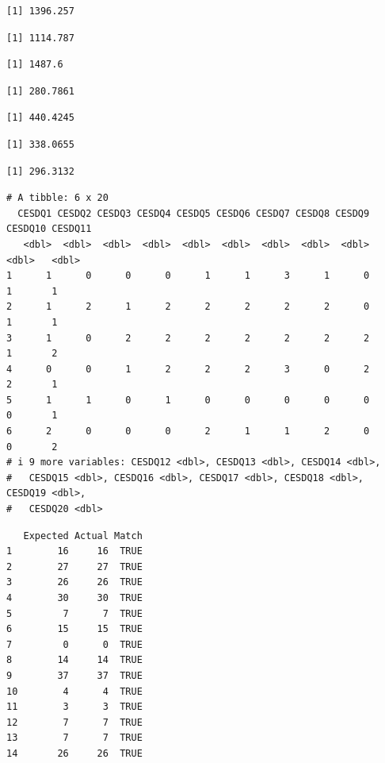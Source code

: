 \documentclass[
]{article}
\begin{document}
\begin{verbatim}
[1] 1396.257
\end{verbatim}

\begin{verbatim}
[1] 1114.787
\end{verbatim}

\begin{verbatim}
[1] 1487.6
\end{verbatim}

\begin{verbatim}
[1] 280.7861
\end{verbatim}

\begin{verbatim}
[1] 440.4245
\end{verbatim}

\begin{verbatim}
[1] 338.0655
\end{verbatim}

\begin{verbatim}
[1] 296.3132
\end{verbatim}

\begin{verbatim}
# A tibble: 6 x 20
  CESDQ1 CESDQ2 CESDQ3 CESDQ4 CESDQ5 CESDQ6 CESDQ7 CESDQ8 CESDQ9 CESDQ10 CESDQ11
   <dbl>  <dbl>  <dbl>  <dbl>  <dbl>  <dbl>  <dbl>  <dbl>  <dbl>   <dbl>   <dbl>
1      1      0      0      0      1      1      3      1      0       1       1
2      1      2      1      2      2      2      2      2      0       1       1
3      1      0      2      2      2      2      2      2      2       1       2
4      0      0      1      2      2      2      3      0      2       2       1
5      1      1      0      1      0      0      0      0      0       0       1
6      2      0      0      0      2      1      1      2      0       0       2
# i 9 more variables: CESDQ12 <dbl>, CESDQ13 <dbl>, CESDQ14 <dbl>,
#   CESDQ15 <dbl>, CESDQ16 <dbl>, CESDQ17 <dbl>, CESDQ18 <dbl>, CESDQ19 <dbl>,
#   CESDQ20 <dbl>
\end{verbatim}

\begin{verbatim}
   Expected Actual Match
1        16     16  TRUE
2        27     27  TRUE
3        26     26  TRUE
4        30     30  TRUE
5         7      7  TRUE
6        15     15  TRUE
7         0      0  TRUE
8        14     14  TRUE
9        37     37  TRUE
10        4      4  TRUE
11        3      3  TRUE
12        7      7  TRUE
13        7      7  TRUE
14       26     26  TRUE
\end{verbatim}
\end{document}
